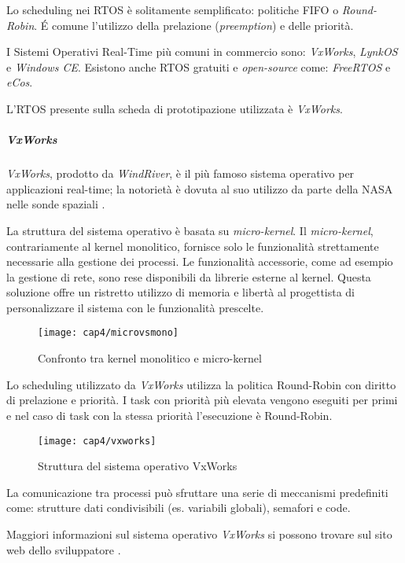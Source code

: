 Lo scheduling nei RTOS è solitamente semplificato: politiche FIFO o \textit{Round-Robin}. \'E comune l'utilizzo della prelazione (\textit{preemption}) e delle priorità.

I Sistemi Operativi Real-Time più comuni in commercio sono: \textit{VxWorks}, \textit{LynkOS} e \textit{Windows CE}. Esistono anche RTOS gratuiti e \textit{open-source} come: \textit{FreeRTOS} e \textit{eCos}.

L'RTOS presente sulla scheda di prototipazione utilizzata è \textit{VxWorks}.


\subparagraph{VxWorks}
\textit{VxWorks}, prodotto da \textit{WindRiver}, è il più famoso sistema operativo per applicazioni real-time; la notorietà è dovuta al suo utilizzo da parte della NASA nelle sonde spaziali \cite{fornacia}.

La struttura del sistema operativo è basata su \textit{micro-kernel}. Il \textit{micro-kernel}, contrariamente al kernel monolitico, fornisce solo le funzionalità strettamente necessarie alla gestione dei processi. Le funzionalità accessorie, come ad esempio la gestione di rete, sono rese disponibili da librerie esterne al kernel. Questa soluzione offre un ristretto utilizzo di memoria e libertà al progettista di personalizzare il sistema con le funzionalità prescelte.

\begin{figure}  
  \begin{center}
    \texttt{[image: cap4/microvsmono]}
    \caption{Confronto tra kernel monolitico e micro-kernel}
  \end{center}
\end{figure}

Lo scheduling utilizzato da \textit{VxWorks} utilizza la politica Round-Robin con diritto di prelazione e priorità. I task con priorità più elevata vengono eseguiti per primi e nel caso di task con la stessa priorità l'esecuzione è Round-Robin.
\begin{figure}  
  \begin{center}
    \texttt{[image: cap4/vxworks]}
    \caption{Struttura del sistema operativo VxWorks}
  \end{center}
\end{figure}

La comunicazione tra processi può sfruttare una serie di meccanismi predefiniti come: strutture dati condivisibili (es. variabili globali), semafori e code.

Maggiori informazioni sul sistema operativo \textit{VxWorks} si possono trovare sul sito web dello sviluppatore \cite{sitevxworks}.


